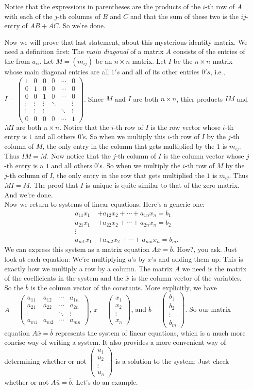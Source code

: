 \documentclass[12pt]{article}
\def\bar#1{\overline{#1}}
\def\mtrx#1{\begin{pmatrix}
#1_{11} & #1_{12} & \cdots & #1_{1n} \\
#1_{21} & #1_{22} & \cdots & #1_{2n} \\
\vdots & \vdots & \ddots & \vdots \\
#1_{m1} & #1_{m2} & \cdots & #1_{mn}
\end{pmatrix} }
\def\colm#1{\begin{pmatrix} #1_1 \\ #1_2 \\ \vdots \\ #1_m \end{pmatrix}}
\def\coln#1{\begin{pmatrix} #1_1 \\ #1_2 \\ \vdots \\ #1_n \end{pmatrix}}
\begin{document}
\noindent
Notice that the expressions in parentheses are the products of the $i$-th row of $A$ with each of the $j$-th columns of $B$ and $C$ and that the sum of these two is the $ij$-entry of $AB + AC$. So we're done.

Now we will prove that last statement, about this mysterious identity matrix. We need a definition first: The {\itshape main diagonal} of a matrix $A$ consists of the entries of the from $a_{ii}$. Let $M = (m_{ij})$ be an $n \times n$ matrix. Let $I$ be the $n \times n$ matrix whose main diagonal entries are all $1's$ and all of its other entries $0's$, i.e., $I = 
\begin{pmatrix} 1 & 0 & 0 & 0 & \cdots & 0 \\ 
                0 & 1 & 0 & 0 & \cdots & 0 \\ 
                0 & 0 & 1 & 0 & \cdots & 0 \\
		\vdots & \vdots & \vdots & \ddots & \ & \vdots \\
		\vdots & \vdots & \vdots & \      &  \ddots  & \vdots \\
		0 & 0 & 0 & 0 & \cdots & 1
\end{pmatrix}$. 
Since $M$ and $I$ are both $n \times n$, thier products $IM$ and $MI$ are both $n \times n$. 
Notice that the $i$-th row of $I$ is the row vector whose $i$-th entry is $1$ and all others $0$'s. So when we multiply this $i$-th row of $I$ by the $j$-th column of $M$, the only entry in the column that gets multiplied by the $1$ is $m_{ij}$. Thus $IM = M$. Now notice that the $j$-th column of $I$ is the column vector whose $j$-th entry is a $1$ and all others $0$'s. So when we multiply the $i$-th row of $M$ by the $j$-th column of $I$, the only entry in the row that gets multiplied the $1$ is $m_{ij}$. Thus $MI = M$. The proof that $I$ is unique is quite similar to that of the zero matrix. And we're done. \\

Now we return to systems of linear equations. Here's a generic one:
\begin{align*}
	a_{11}x_1 &+ a_{12}x_2 + \cdots + a_{1n}x_n = b_1 \\
	a_{21}x_1 &+ a_{22}x_2 + \cdots + a_{2n}x_n = b_2 \\
	\vdots  \\
	a_{m1}x_1 &+ a_{m2}x_2 + \cdots + a_{mn}x_n = b_m.
	\end{align*}
We can express this system as a matrix equation $A\bar{x} = \bar{b}$. How?, you ask. Just look at each equation: We're multiplying $a$'s by $x$'s and adding them up. This is exactly how we multiply a row by a column. The matrix $A$ we need is the matrix of the coefficients in the system and the $\bar{x}$ is the column vector of the variables. So the $\bar{b}$ is the column vector of the constants. More explicitly, we have $A = \mtrx{a}$, $\bar{x} = \coln{x}$, and $\bar{b} = \colm{b}$. So our matrix equation $A\bar{x} = \bar{b}$ represents the system of linear equations, which is a much more concise way of writing a system. It also provides a more convenient way of determining whether or not $\coln{u}$ is a solution to the system: Just check whether or not $A\bar{u} = \bar{b}$. Let's do an example. 
\end{document}
